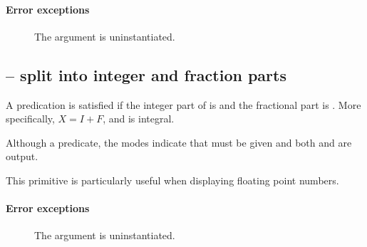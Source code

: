 \paragraph{Error exceptions}
\begin{description}
\item[]
The argument  is uninstantiated.
\end{description}

\subsection{ -- split into integer and fraction parts}
\label{arith:modf}


A predication  is satisfied if the integer part of  is  and the fractional part is . More specifically,  $X=I+F$, and  is integral.

Although a predicate, the modes indicate that  must be given and both  and  are output.

This primitive is particularly useful when displaying floating point numbers.

\paragraph{Error exceptions}
\begin{description}
\item[]
The argument  is uninstantiated.
\end{description}

